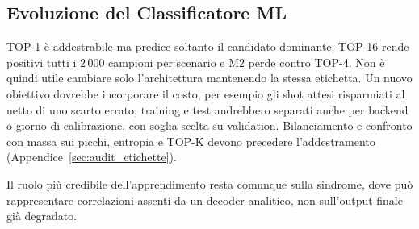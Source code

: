 \begin{onehalfspace}
\section{Evoluzione del Classificatore ML}
\label{sec:evoluzione_ml}

TOP-1 è addestrabile ma predice soltanto il candidato dominante; TOP-16 rende
positivi tutti i $2\,000$ campioni per scenario e M2 perde contro TOP-4. Non è
quindi utile cambiare solo l'architettura mantenendo la stessa etichetta. Un
nuovo obiettivo dovrebbe incorporare il costo, per esempio gli shot attesi
risparmiati al netto di uno scarto errato; training e test andrebbero separati
anche per backend o giorno di calibrazione, con soglia scelta su validation.
Bilanciamento e confronto con massa sui picchi, entropia e TOP-K devono
precedere l'addestramento (Appendice~\ref{sec:audit_etichette}).

Il ruolo più credibile dell'apprendimento resta comunque sulla sindrome, dove
può rappresentare correlazioni assenti da un decoder analitico, non sull'output
finale già degradato.

\end{onehalfspace}
